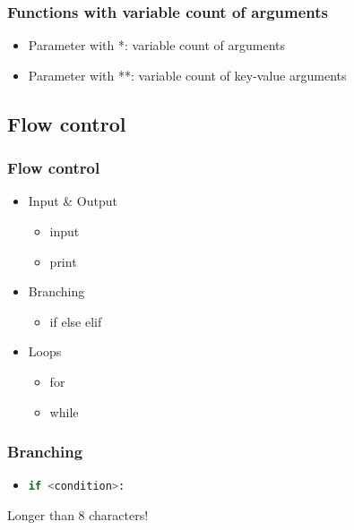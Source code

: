 \documentclass[ngerman]{beamer}
\newcommand{\ta}[1]{\textattachfile[color=1 0 0]{#1}{Code}}
\begin{document}
\begin{frame}
\frametitle{Functions with variable count of arguments}

\begin{itemize}
\item Parameter with *: variable count of arguments
\item Parameter with **: variable count of key-value arguments
\end{itemize}





\end{frame}


\subsection{Flow control}

\begin{frame}
\frametitle{Flow control}

\begin{itemize}
\item Input \& Output
\begin{itemize}
	\item input
	\item print
\end{itemize}

\item Branching
\begin{itemize}
	\item if else elif
\end{itemize}

\item Loops
\begin{itemize}
	\item for
	\item while
\end{itemize}

\end{itemize}
\end{frame}

\begin{frame}[containsverbatim]
\frametitle{Branching}

\begin{itemize}
\item \lstinline[language={Python}]{if <condition>:}
\end{itemize}



\begin{ausgabe}
Longer than 8 characters!
\end{ausgabe}
\end{frame}
\end{document}
